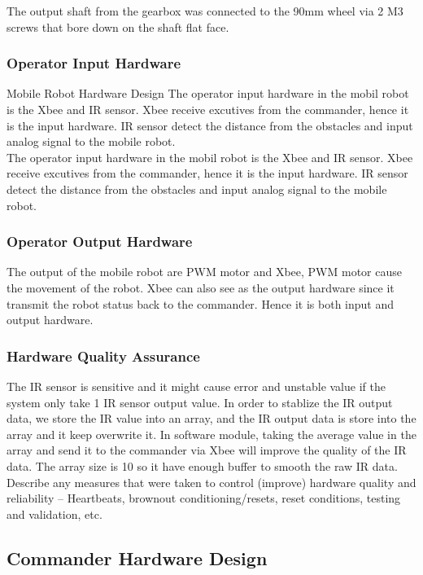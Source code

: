 \documentclass[11pt,a4paper]{article}
\begin{document}
     
     
      The output shaft from the gearbox was connected to the 90mm wheel via 2 M3 screws that bore down on the shaft flat face. 
    \subsubsection{Operator Input Hardware}

    Mobile Robot Hardware Design
  The operator input hardware in the mobil robot is the Xbee and IR sensor. Xbee receive excutives from the commander, hence it is the input hardware. IR sensor detect the distance from the obstacles and input analog signal to the mobile robot.\\
    The operator input hardware in the mobil robot is the Xbee and IR sensor. Xbee receive excutives from the commander, hence it is the input hardware. IR sensor detect the distance from the obstacles and input analog signal to the mobile 
robot.  

    \subsubsection{Operator Output Hardware}
    The output of the mobile robot are PWM motor and Xbee, PWM motor cause the movement of the robot. Xbee can also see as the output hardware since it transmit the robot status back to the commander. Hence it is both input and output hardware.
    \subsubsection{Hardware Quality Assurance}
    The IR sensor is sensitive and it might cause error and unstable value if the system only take 1 IR sensor output value. In order to stablize the IR output data, we store the IR value into an array, and the IR output data is store into the array and it keep overwrite it. In software module, taking the average value in the array and send it to the commander via Xbee will improve the quality of the IR data. The array size is 10 so it have enough buffer to smooth the raw IR data.\\

    Describe any measures that were taken to control (improve) hardware quality and reliability – Heartbeats, brownout conditioning/resets, reset conditions, testing and validation, etc.
  \subsection{Commander Hardware Design}
\end{document}
